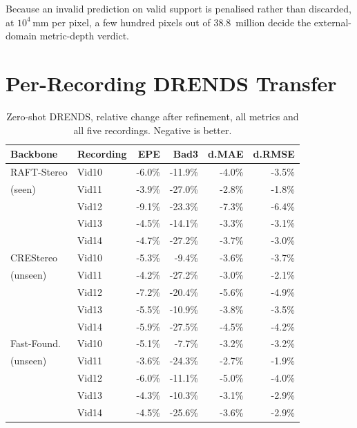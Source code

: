 \documentclass[letterpaper,10pt,conference]{ieeeconf}
\begin{document}
Because an invalid prediction on valid support is penalised rather than
discarded, at $10^{4}$\,mm per pixel, a few hundred pixels out of
$38.8$~million decide the external-domain metric-depth verdict.

\section{Per-Recording DRENDS Transfer}

\begin{table}[htb]
\centering
\small
\caption{Zero-shot DRENDS, relative change after refinement, all metrics
and all five recordings. Negative is better.}
\label{sup:drends}
\begin{tabular}{llrrrr}
\toprule
Backbone & Recording & EPE & Bad3 & d.MAE & d.RMSE \\
\midrule
RAFT-Stereo & Vid10 & -6.0\% & -11.9\% & -4.0\% & -3.5\% \\
(seen)      & Vid11 & -3.9\% & -27.0\% & -2.8\% & -1.8\% \\
            & Vid12 & -9.1\% & -23.3\% & -7.3\% & -6.4\% \\
            & Vid13 & -4.5\% & -14.1\% & -3.3\% & -3.1\% \\
            & Vid14 & -4.7\% & -27.2\% & -3.7\% & -3.0\% \\
\midrule
CREStereo   & Vid10 & -5.3\% &  -9.4\% & -3.6\% & -3.7\% \\
(unseen)    & Vid11 & -4.2\% & -27.2\% & -3.0\% & -2.1\% \\
            & Vid12 & -7.2\% & -20.4\% & -5.6\% & -4.9\% \\
            & Vid13 & -5.5\% & -10.9\% & -3.8\% & -3.5\% \\
            & Vid14 & -5.9\% & -27.5\% & -4.5\% & -4.2\% \\
\midrule
Fast-Found. & Vid10 & -5.1\% &  -7.7\% & -3.2\% & -3.2\% \\
(unseen)    & Vid11 & -3.6\% & -24.3\% & -2.7\% & -1.9\% \\
            & Vid12 & -6.0\% & -11.1\% & -5.0\% & -4.0\% \\
            & Vid13 & -4.3\% & -10.3\% & -3.1\% & -2.9\% \\
            & Vid14 & -4.5\% & -25.6\% & -3.6\% & -2.9\% \\
\bottomrule
\end{tabular}
\end{table}
\end{document}
